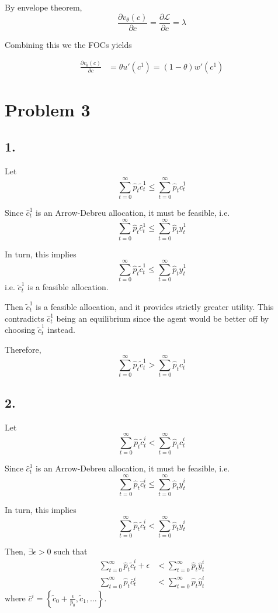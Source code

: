 \documentclass[12pt]{article}
\theoremstyle{definition}
\newcommand{\cbra}[1]{\left\{#1\right\}}
\begin{document}
By envelope theorem,
\[
\frac{\partial v_\theta(c)}{\partial c} = \frac{\partial \mathcal{L}}{\partial c} = \lambda
\]

Combining this we the FOCs yields

\begin{align*}
\frac{\partial v_\theta(c)}{\partial c} &= \theta u'(c^1) = (1-\theta) w'(c^1)
\end{align*}

\section*{Problem 3}
\subsection*{1.}

Let
\[
\sum_{t=0}^{\infty} \hat{p}_t \tilde{c}_t^1 \leq \sum_{t=0}^{\infty} \hat{p}_t \hat{c}_t^1
\]

Since $\hat{c}_t^1$ is an Arrow-Debreu allocation, it must be feasible, i.e.
\[
\sum_{t=0}^{\infty} \hat{p}_t \hat{c}_t^1 \leq \sum_{t=0}^{\infty} \hat{p}_t \hat{y}_t^1
\]

In turn, this implies 
\[
\sum_{t=0}^{\infty} \hat{p}_t \tilde{c}_t^1 \leq \sum_{t=0}^{\infty} \hat{p}_t \hat{y}_t^1
\]
i.e. $\tilde{c}_t^1$ is a feasible allocation.

Then $\tilde{c}_t^1$ is a feasible allocation, and it provides strictly greater utility. This contradicts $\hat{c}_t^1$ being an equilibrium since the agent would be better off by choosing $\tilde{c}_t^1$ instead.

Therefore,
\[
\sum_{t=0}^{\infty} \hat{p}_t \tilde{c}_t^1 > \sum_{t=0}^{\infty} \hat{p}_t \hat{c}_t^1
\]

\subsection*{2.}

Let
\[
\sum_{t=0}^{\infty} \hat{p}_t \tilde{c}_t^i < \sum_{t=0}^{\infty} \hat{p}_t \hat{c}_t^i
\]

Since $\hat{c}_t^1$ is an Arrow-Debreu allocation, it must be feasible, i.e.
\[
\sum_{t=0}^{\infty} \hat{p}_t \hat{c}_t^i \leq \sum_{t=0}^{\infty} \hat{p}_t \hat{y}_t^i
\]

In turn, this implies 
\[
\sum_{t=0}^{\infty} \hat{p}_t \tilde{c}_t^i < \sum_{t=0}^{\infty} \hat{p}_t \hat{y}_t^i
\]

Then, $\exists \epsilon>0$ such that 
\begin{align*}
	\sum_{t=0}^{\infty} \hat{p}_t \tilde{c}_t^i  + \epsilon & < \sum_{t=0}^{\infty} \hat{p}_t \hat{y}_t^i\\
	\sum_{t=0}^{\infty} \hat{p}_t \bar{c}_t^i   & < \sum_{t=0}^{\infty} \hat{p}_t \hat{y}_t^i
\end{align*}
where $\bar{c}^i = \cbra{\tilde{c}_0 + \frac{\epsilon}{\hat{p}_0}, \tilde{c}_1, \dots}$.
\end{document}
